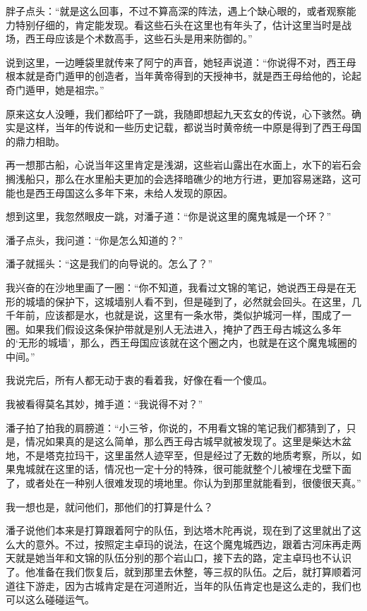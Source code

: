 胖子点头：“就是这么回事，不过不算高深的阵法，遇上个缺心眼的，或者观察能力特别仔细的，肯定能发现。看这些石头在这里也有年头了，估计这里当时是战场，西王母应该是个术数高手，这些石头是用来防御的。”

说到这里，一边睡袋里就传来了阿宁的声音，她轻声说道：“你说得不对，西王母根本就是奇门遁甲的创造者，当年黄帝得到的天授神书，就是西王母给他的，论起奇门遁甲，她是祖宗。”

原来这女人没睡，我们都给吓了一跳，我随即想起九天玄女的传说，心下骇然。确实是这样，当年的传说和一些历史记载，都说当时黄帝统一中原是得到了西王母国的鼎力相助。

再一想那古船，心说当年这里肯定是浅湖，这些岩山露出在水面上，水下的岩石会搁浅船只，那么在水里船夫更加的会选择暗礁少的地方行进，更加容易迷路，这可能也是西王母国这么多年下来，未给人发现的原因。

想到这里，我忽然眼皮一跳，对潘子道：“你是说这里的魔鬼城是一个环？”

潘子点头，我问道：“你是怎么知道的？”

潘子就摇头：“这是我们的向导说的。怎么了？”

我兴奋的在沙地里画了一圈：“你不知道，我看过文锦的笔记，她说西王母是在无形的城墙的保护下，这城墙别人看不到，但是碰到了，必然就会回头。在这里，几千年前，应该都是水，也就是说，这里有一条水带，类似护城河一样，围成了一圈。如果我们假设这条保护带就是别人无法进入，掩护了西王母古城这么多年的‘无形的城墙’，那么，西王母国应该就在这个圈之内，也就是在这个魔鬼城圈的中间。”

我说完后，所有人都无动于衷的看着我，好像在看一个傻瓜。

我被看得莫名其妙，摊手道：“我说得不对？”

潘子拍了拍我的肩膀道：“小三爷，你说的，不用看文锦的笔记我们都猜到了，只是，情况如果真的是这么简单，那么西王母古城早就被发现了。这里是柴达木盆地，不是塔克拉玛干，这里虽然人迹罕至，但是经过了无数的地质考察，所以，如果鬼城就在这里的话，情况也一定十分的特殊，很可能就整个儿被埋在戈壁下面了，或者处在一种别人很难发现的境地里。你认为到那里就能看到，很傻很天真。”

我一想也是，就问他们，那他们的打算是什么？

潘子说他们本来是打算跟着阿宁的队伍，到达塔木陀再说，现在到了这里就出了这么大的意外。不过，按照定主卓玛的说法，在这个魔鬼城西边，跟着古河床再走两天就是她当年和文锦的队伍分别的那个岩山口，接下去的路，定主卓玛也不认识了。他准备在我们恢复后，就到那里去休整，等三叔的队伍。之后，就打算顺着河道往下游走，因为古城肯定是在河道附近，当年的队伍肯定也是这么走的，我们也可以这么碰碰运气。

